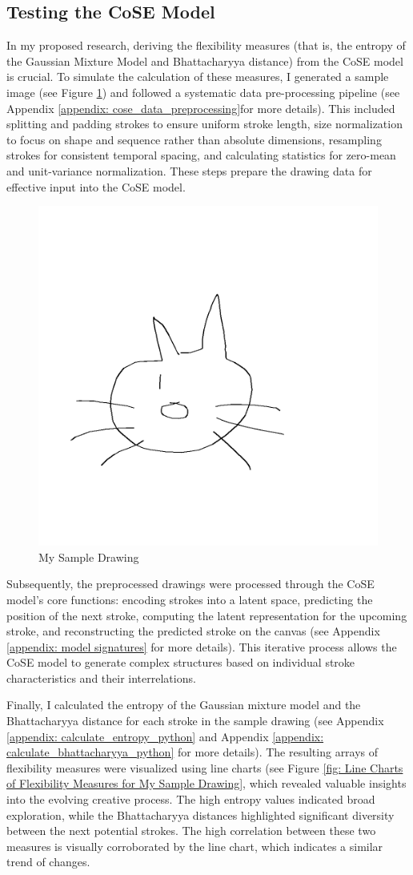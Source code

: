 \documentclass[../Proposal_Writing_Sample.tex]{subfiles}
\begin{document}
\subsection*{Testing the CoSE Model}
In my proposed research, deriving the flexibility measures (that is, the entropy of the Gaussian Mixture Model and Bhattacharyya distance) from the CoSE model is crucial. To simulate the calculation of these measures, I generated a sample image (see Figure \ref{fig: My Sample Drawing}) and followed a systematic data pre-processing pipeline (see Appendix \ref{appendix: cose_data_preprocessing}for more details). This included splitting and padding strokes to ensure uniform stroke length, size normalization to focus on shape and sequence rather than absolute dimensions, resampling strokes for consistent temporal spacing, and calculating statistics for zero-mean and unit-variance normalization. These steps prepare the drawing data for effective input into the CoSE model. 

\begin{figure}[ht]
    \centering
    \includegraphics[width=0.5\linewidth, keepaspectratio]{screenshots/my_sample_drawing.png}
    \caption{My Sample Drawing}
    \label{fig: My Sample Drawing}
\end{figure}

Subsequently, the preprocessed drawings were processed through the CoSE model's core functions: encoding strokes into a latent space, predicting the position of the next stroke, computing the latent representation for the upcoming stroke, and reconstructing the predicted stroke on the canvas (see Appendix \ref{appendix: model signatures} for more details). This iterative process allows the CoSE model to generate complex structures based on individual stroke characteristics and their interrelations. 

Finally, I calculated the entropy of the Gaussian mixture model and the Bhattacharyya distance for each stroke in the sample drawing (see Appendix \ref{appendix: calculate_entropy_python} and Appendix \ref{appendix: calculate_bhattacharyya_python} for more details). The resulting arrays of flexibility measures were visualized using line charts (see Figure \ref{fig: Line Charts of Flexibility Measures for My Sample Drawing}, which revealed valuable insights into the evolving creative process. The high entropy values indicated broad exploration, while the Bhattacharyya distances highlighted significant diversity between the next potential strokes. The high correlation between these two measures is visually corroborated by the line chart, which indicates a similar trend of changes. 
\end{document}
